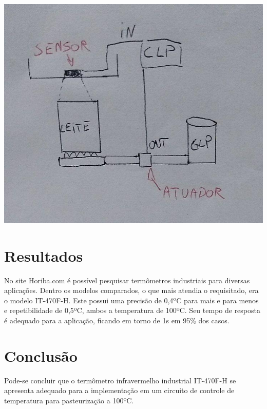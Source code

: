 \documentclass{article}
\begin{document}
\includegraphics[scale=0.3]{esquema}


\section{Resultados}
No site Horiba.com é possível pesquisar termômetros industriais para diversas aplicações. Dentro os modelos comparados, o que mais atendia o requisitado, era o modelo IT-470F-H. Este possui uma precisão de 0,4ºC para mais e para menos e repetibilidade de 0,5ºC, ambos a temperatura de 100ºC. Seu tempo de resposta é adequado para a aplicação, ficando em torno de 1s em 95\% dos casos.

\section{Conclusão}
Pode-se concluir que o termômetro infravermelho industrial IT-470F-H se apresenta adequado para a implementação em um circuito de controle de temperatura para pasteurização a 100ºC.
\end{document}

